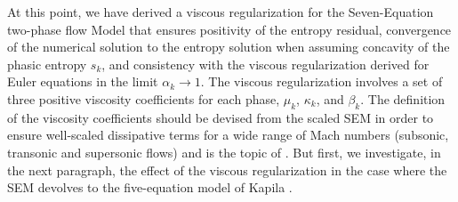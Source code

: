 %
At this point, we have derived a viscous regularization for the Seven-Equation two-phase flow Model that ensures positivity of the 
entropy residual, convergence of the numerical solution to the entropy solution when assuming concavity of the phasic entropy $s_k$, and consistency with 
the viscous regularization derived for Euler equations \cite{jlg,Marco_paper_low_mach} in the limit $\alpha_k \to 1$. The viscous 
regularization involves a set of three positive viscosity coefficients for each phase, $\mu_k$, $\kappa_k$, and $\beta_k$. The definition 
of the viscosity coefficients should be devised from the scaled SEM in order to ensure well-scaled dissipative terms for a wide range 
of Mach numbers (subsonic, transonic and supersonic flows) and is the topic of . But first, we investigate, in the 
next paragraph, the effect of the viscous regularization in the case where the SEM devolves to the five-equation model of 
Kapila \cite{Kapila_2001}.
%
